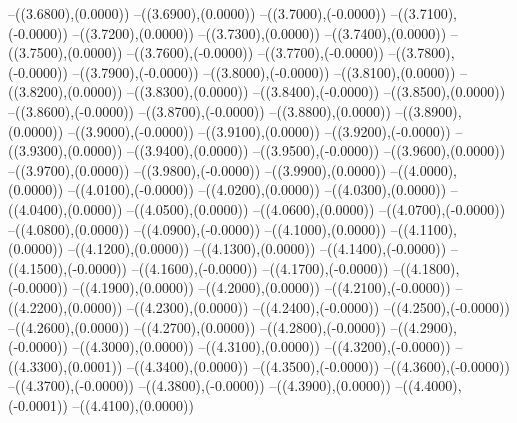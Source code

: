 {	--({\sx*(3.6800)},{\sy*(0.0000)})
	--({\sx*(3.6900)},{\sy*(0.0000)})
	--({\sx*(3.7000)},{\sy*(-0.0000)})
	--({\sx*(3.7100)},{\sy*(-0.0000)})
	--({\sx*(3.7200)},{\sy*(0.0000)})
	--({\sx*(3.7300)},{\sy*(0.0000)})
	--({\sx*(3.7400)},{\sy*(0.0000)})
	--({\sx*(3.7500)},{\sy*(0.0000)})
	--({\sx*(3.7600)},{\sy*(-0.0000)})
	--({\sx*(3.7700)},{\sy*(-0.0000)})
	--({\sx*(3.7800)},{\sy*(-0.0000)})
	--({\sx*(3.7900)},{\sy*(-0.0000)})
	--({\sx*(3.8000)},{\sy*(-0.0000)})
	--({\sx*(3.8100)},{\sy*(0.0000)})
	--({\sx*(3.8200)},{\sy*(0.0000)})
	--({\sx*(3.8300)},{\sy*(0.0000)})
	--({\sx*(3.8400)},{\sy*(-0.0000)})
	--({\sx*(3.8500)},{\sy*(0.0000)})
	--({\sx*(3.8600)},{\sy*(-0.0000)})
	--({\sx*(3.8700)},{\sy*(-0.0000)})
	--({\sx*(3.8800)},{\sy*(0.0000)})
	--({\sx*(3.8900)},{\sy*(0.0000)})
	--({\sx*(3.9000)},{\sy*(-0.0000)})
	--({\sx*(3.9100)},{\sy*(0.0000)})
	--({\sx*(3.9200)},{\sy*(-0.0000)})
	--({\sx*(3.9300)},{\sy*(0.0000)})
	--({\sx*(3.9400)},{\sy*(0.0000)})
	--({\sx*(3.9500)},{\sy*(-0.0000)})
	--({\sx*(3.9600)},{\sy*(0.0000)})
	--({\sx*(3.9700)},{\sy*(0.0000)})
	--({\sx*(3.9800)},{\sy*(-0.0000)})
	--({\sx*(3.9900)},{\sy*(0.0000)})
	--({\sx*(4.0000)},{\sy*(0.0000)})
	--({\sx*(4.0100)},{\sy*(-0.0000)})
	--({\sx*(4.0200)},{\sy*(0.0000)})
	--({\sx*(4.0300)},{\sy*(0.0000)})
	--({\sx*(4.0400)},{\sy*(0.0000)})
	--({\sx*(4.0500)},{\sy*(0.0000)})
	--({\sx*(4.0600)},{\sy*(0.0000)})
	--({\sx*(4.0700)},{\sy*(-0.0000)})
	--({\sx*(4.0800)},{\sy*(0.0000)})
	--({\sx*(4.0900)},{\sy*(-0.0000)})
	--({\sx*(4.1000)},{\sy*(0.0000)})
	--({\sx*(4.1100)},{\sy*(0.0000)})
	--({\sx*(4.1200)},{\sy*(0.0000)})
	--({\sx*(4.1300)},{\sy*(0.0000)})
	--({\sx*(4.1400)},{\sy*(-0.0000)})
	--({\sx*(4.1500)},{\sy*(-0.0000)})
	--({\sx*(4.1600)},{\sy*(-0.0000)})
	--({\sx*(4.1700)},{\sy*(-0.0000)})
	--({\sx*(4.1800)},{\sy*(-0.0000)})
	--({\sx*(4.1900)},{\sy*(0.0000)})
	--({\sx*(4.2000)},{\sy*(0.0000)})
	--({\sx*(4.2100)},{\sy*(-0.0000)})
	--({\sx*(4.2200)},{\sy*(0.0000)})
	--({\sx*(4.2300)},{\sy*(0.0000)})
	--({\sx*(4.2400)},{\sy*(-0.0000)})
	--({\sx*(4.2500)},{\sy*(-0.0000)})
	--({\sx*(4.2600)},{\sy*(0.0000)})
	--({\sx*(4.2700)},{\sy*(0.0000)})
	--({\sx*(4.2800)},{\sy*(-0.0000)})
	--({\sx*(4.2900)},{\sy*(-0.0000)})
	--({\sx*(4.3000)},{\sy*(0.0000)})
	--({\sx*(4.3100)},{\sy*(0.0000)})
	--({\sx*(4.3200)},{\sy*(-0.0000)})
	--({\sx*(4.3300)},{\sy*(0.0001)})
	--({\sx*(4.3400)},{\sy*(0.0000)})
	--({\sx*(4.3500)},{\sy*(-0.0000)})
	--({\sx*(4.3600)},{\sy*(-0.0000)})
	--({\sx*(4.3700)},{\sy*(-0.0000)})
	--({\sx*(4.3800)},{\sy*(-0.0000)})
	--({\sx*(4.3900)},{\sy*(0.0000)})
	--({\sx*(4.4000)},{\sy*(-0.0001)})
	--({\sx*(4.4100)},{\sy*(0.0000)})
}
